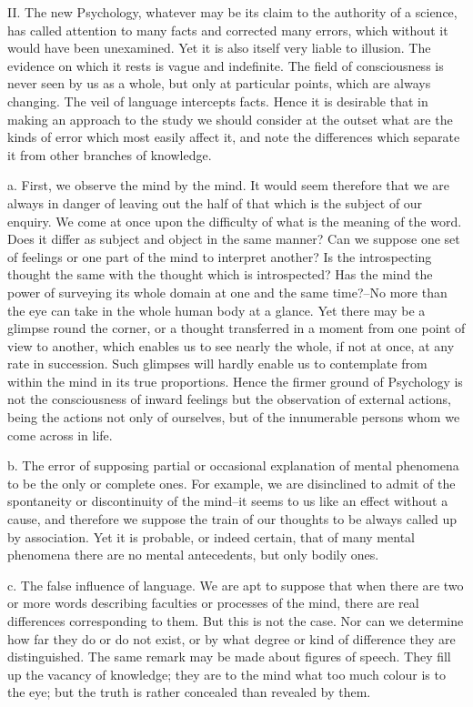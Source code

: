 II. The new Psychology, whatever may be its claim to the authority of a
science, has called attention to many facts and corrected many errors,
which without it would have been unexamined. Yet it is also itself
very liable to illusion. The evidence on which it rests is vague and
indefinite. The field of consciousness is never seen by us as a whole,
but only at particular points, which are always changing. The veil
of language intercepts facts. Hence it is desirable that in making an
approach to the study we should consider at the outset what are the
kinds of error which most easily affect it, and note the differences
which separate it from other branches of knowledge.

a. First, we observe the mind by the mind. It would seem therefore that
we are always in danger of leaving out the half of that which is the
subject of our enquiry. We come at once upon the difficulty of what is
the meaning of the word. Does it differ as subject and object in the
same manner? Can we suppose one set of feelings or one part of the mind
to interpret another? Is the introspecting thought the same with the
thought which is introspected? Has the mind the power of surveying its
whole domain at one and the same time?--No more than the eye can take in
the whole human body at a glance. Yet there may be a glimpse round the
corner, or a thought transferred in a moment from one point of view to
another, which enables us to see nearly the whole, if not at once,
at any rate in succession. Such glimpses will hardly enable us to
contemplate from within the mind in its true proportions. Hence the
firmer ground of Psychology is not the consciousness of inward feelings
but the observation of external actions, being the actions not only of
ourselves, but of the innumerable persons whom we come across in life.

b. The error of supposing partial or occasional explanation of
mental phenomena to be the only or complete ones. For example, we are
disinclined to admit of the spontaneity or discontinuity of the mind--it
seems to us like an effect without a cause, and therefore we suppose the
train of our thoughts to be always called up by association. Yet it is
probable, or indeed certain, that of many mental phenomena there are no
mental antecedents, but only bodily ones.

c. The false influence of language. We are apt to suppose that when
there are two or more words describing faculties or processes of the
mind, there are real differences corresponding to them. But this is not
the case. Nor can we determine how far they do or do not exist, or
by what degree or kind of difference they are distinguished. The same
remark may be made about figures of speech. They fill up the vacancy of
knowledge; they are to the mind what too much colour is to the eye; but
the truth is rather concealed than revealed by them.

